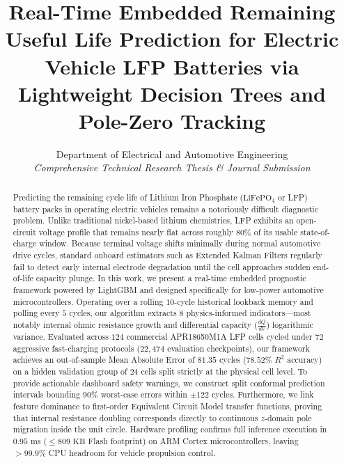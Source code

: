 \documentclass[journal,10pt]{IEEEtran}
\begin{document}
\title{Real-Time Embedded Remaining Useful Life Prediction for Electric Vehicle LFP Batteries via Lightweight Decision Trees and Pole-Zero Tracking}

\author{Department of Electrical and Automotive Engineering\\
\textit{Comprehensive Technical Research Thesis \& Journal Submission}}

\maketitle

\begin{abstract}
Predicting the remaining cycle life of Lithium Iron Phosphate ($\text{LiFePO}_4$ or LFP) battery packs in operating electric vehicles remains a notoriously difficult diagnostic problem. Unlike traditional nickel-based lithium chemistries, LFP exhibits an open-circuit voltage profile that remains nearly flat across roughly $80\%$ of its usable state-of-charge window. Because terminal voltage shifts minimally during normal automotive drive cycles, standard onboard estimators such as Extended Kalman Filters regularly fail to detect early internal electrode degradation until the cell approaches sudden end-of-life capacity plunge. In this work, we present a real-time embedded prognostic framework powered by LightGBM and designed specifically for low-power automotive microcontrollers. Operating over a rolling $10$-cycle historical lookback memory and polling every $5$ cycles, our algorithm extracts $8$ physics-informed indicators—most notably internal ohmic resistance growth and differential capacity ($\frac{dQ}{dV}$) logarithmic variance. Evaluated across $124$ commercial APR18650M1A LFP cells cycled under $72$ aggressive fast-charging protocols ($22,474$ evaluation checkpoints), our framework achieves an out-of-sample Mean Absolute Error of $81.35$ cycles ($78.52\%$ $R^2$ accuracy) on a hidden validation group of $24$ cells split strictly at the physical cell level. To provide actionable dashboard safety warnings, we construct split conformal prediction intervals bounding $90\%$ worst-case errors within $\pm 122$ cycles. Furthermore, we link feature dominance to first-order Equivalent Circuit Model transfer functions, proving that internal resistance doubling corresponds directly to continuous $z$-domain pole migration inside the unit circle. Hardware profiling confirms full inference execution in $0.95\text{ ms}$ ($\le 809\text{ KB}$ Flash footprint) on ARM Cortex microcontrollers, leaving $>99.9\%$ CPU headroom for vehicle propulsion control.
\end{abstract}
\end{document}
